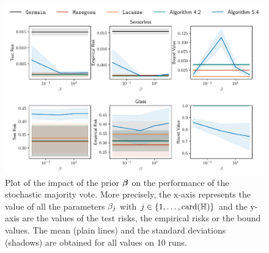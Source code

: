 \begin{noaddcontents}
\begin{figure}
    \centering
    \includegraphics[width=\textwidth]{chapter_5/figures/prior_4.pdf}
    \caption{
    Plot of the impact of the prior $\boldsymbol{\beta}$ on the performance of the stochastic majority vote.
    More precisely, the x-axis represents the value of all the parameters $\beta_j$ with $j\in\{1,\dots,\operatorname{card}(\mathbb{H})\}$ and the y-axis are the values of the test risks, the empirical risks or the bound values.
    The mean (plain lines) and the standard deviations (shadows) are obtained for all values on 10 runs.
    }
    \label{ap:mv-sto:fig:prior-4}
\end{figure}


\end{noaddcontents}
